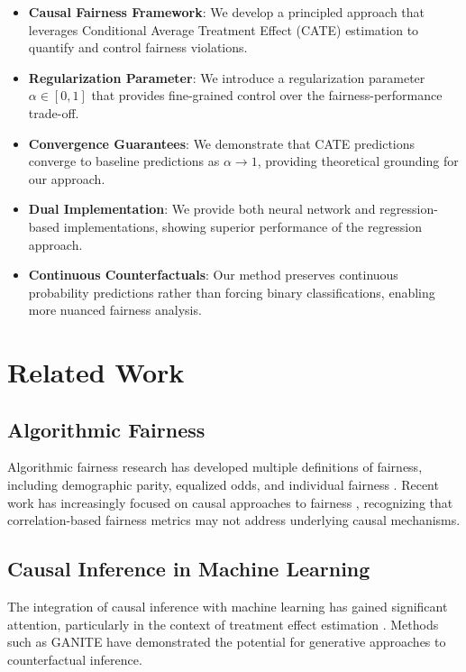 \documentclass{article} %
\begin{document}
\begin{itemize}
\item \textbf{Causal Fairness Framework}: We develop a principled approach that leverages Conditional Average Treatment Effect (CATE) estimation to quantify and control fairness violations.
\item \textbf{Regularization Parameter}: We introduce a regularization parameter $\alpha \in [0,1]$ that provides fine-grained control over the fairness-performance trade-off.
\item \textbf{Convergence Guarantees}: We demonstrate that CATE predictions converge to baseline predictions as $\alpha \to 1$, providing theoretical grounding for our approach.
\item \textbf{Dual Implementation}: We provide both neural network and regression-based implementations, showing superior performance of the regression approach.
\item \textbf{Continuous Counterfactuals}: Our method preserves continuous probability predictions rather than forcing binary classifications, enabling more nuanced fairness analysis.
\end{itemize}

\section{Related Work}

\subsection{Algorithmic Fairness}

Algorithmic fairness research has developed multiple definitions of fairness, including demographic parity, equalized odds, and individual fairness \citep{dwork2012fairness}. Recent work has increasingly focused on causal approaches to fairness \citep{kusner2017counterfactual}, recognizing that correlation-based fairness metrics may not address underlying causal mechanisms.

\subsection{Causal Inference in Machine Learning}

The integration of causal inference with machine learning has gained significant attention, particularly in the context of treatment effect estimation \citep{rubin2005causal}. Methods such as GANITE \citep{yoon2018ganite} have demonstrated the potential for generative approaches to counterfactual inference.
\end{document}

